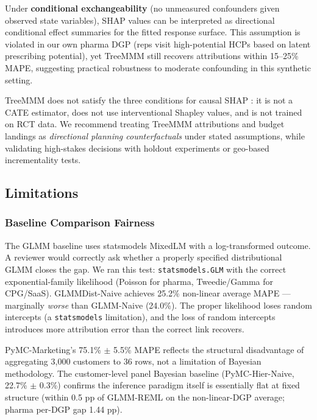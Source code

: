 \documentclass[review,12pt]{elsarticle}
\begin{document}
Under \textbf{conditional exchangeability} (no unmeasured confounders given
observed state variables), SHAP values can be interpreted as directional
conditional effect summaries for the fitted response surface. This assumption
is violated in our own pharma DGP (reps visit high-potential HCPs based on
latent prescribing potential), yet TreeMMM still recovers attributions within
15--25\% MAPE, suggesting practical robustness to moderate confounding in this
synthetic setting.

TreeMMM does not satisfy the three conditions for causal SHAP
\cite{heskes2020causal,janzing2020feature}: it is not a CATE estimator, does not
use interventional Shapley values, and is not trained on RCT data. We recommend
treating TreeMMM attributions and budget landings as \emph{directional planning
counterfactuals} under stated assumptions, while validating high-stakes
decisions with holdout experiments or geo-based incrementality tests.

\subsection{Limitations}
\label{sec:limits}

\subsubsection{Baseline Comparison Fairness}
\label{sec:limits:fairness}

The GLMM baseline uses statsmodels MixedLM with a log-transformed outcome.
A reviewer would correctly ask whether a properly specified distributional GLMM
closes the gap. We ran this test: \texttt{statsmodels.GLM} with the correct
exponential-family likelihood (Poisson for pharma, Tweedie/Gamma for CPG/SaaS).
GLMMDist-Naive achieves 25.2\% non-linear average MAPE --- marginally \emph{worse}
than GLMM-Naive (24.0\%). The proper likelihood loses random intercepts (a
\texttt{statsmodels} limitation), and the loss of random intercepts introduces
more attribution error than the correct link recovers.

PyMC-Marketing's 75.1\% $\pm$ 5.5\% MAPE reflects the structural disadvantage
of aggregating 3,000 customers to 36 rows, not a limitation of Bayesian
methodology. The customer-level panel Bayesian baseline (PyMC-Hier-Naive,
22.7\% $\pm$ 0.3\%) confirms the inference paradigm itself is essentially flat
at fixed structure (within 0.5 pp of GLMM-REML on the non-linear-DGP average;
pharma per-DGP gap 1.44 pp).
\end{document}
